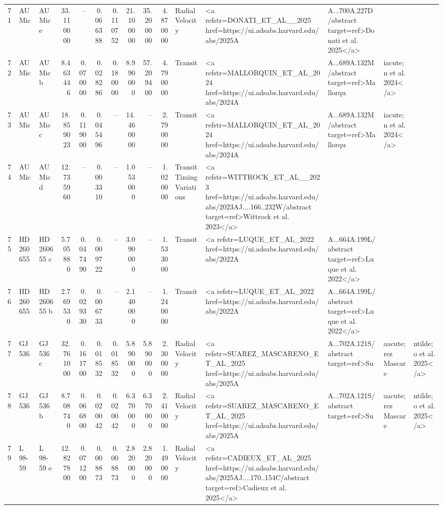 \begin{tabular}{lllrrrrrrrll}
71 & AU Mic & AU Mic e & 33.110000 & -- & 0.066388 & 0.110752 & 21.100000 & 35.200000 & 4.870000 & Radial Velocity & <a refstr=DONATI_ET_AL__2025 href=https://ui.adsabs.harvard.edu/abs/2025A&A...700A.227D/abstract target=ref>Donati et al. 2025</a> \\
72 & AU Mic & AU Mic b & 8.463446 & 0.070000 & 0.028286 & 0.180000 & 8.990000 & 57.209400 & 4.790000 & Transit & <a refstr=MALLORQUIN_ET_AL_2024 href=https://ui.adsabs.harvard.edu/abs/2024A&A...689A.132M/abstract target=ref>Mallorqu&iacute;n et al. 2024</a> \\
73 & AU Mic & AU Mic c & 18.859023 & 0.119000 & 0.045496 & -- & 14.460000 & -- & 2.790000 & Transit & <a refstr=MALLORQUIN_ET_AL_2024 href=https://ui.adsabs.harvard.edu/abs/2024A&A...689A.132M/abstract target=ref>Mallorqu&iacute;n et al. 2024</a> \\
74 & AU Mic & AU Mic d & 12.735960 & -- & 0.003310 & -- & 1.053000 & -- & 1.020000 & Transit Timing Variations & <a refstr=WITTROCK_ET_AL__2023 href=https://ui.adsabs.harvard.edu/abs/2023AJ....166..232W/abstract target=ref>Wittrock et al. 2023</a> \\
75 & HD 260655 & HD 260655 c & 5.705880 & 0.047490 & 0.009722 & -- & 3.090000 & -- & 1.533000 & Transit & <a refstr=LUQUE_ET_AL_2022 href=https://ui.adsabs.harvard.edu/abs/2022A&A...664A.199L/abstract target=ref>Luque et al. 2022</a> \\
76 & HD 260655 & HD 260655 b & 2.769530 & 0.029330 & 0.006733 & -- & 2.140000 & -- & 1.240000 & Transit & <a refstr=LUQUE_ET_AL_2022 href=https://ui.adsabs.harvard.edu/abs/2022A&A...664A.199L/abstract target=ref>Luque et al. 2022</a> \\
77 & GJ 536 & GJ 536 c & 32.761000 & 0.161700 & 0.018532 & 0.018532 & 5.890000 & 5.890000 & 2.300000 & Radial Velocity & <a refstr=SUAREZ_MASCARENO_ET_AL_2025 href=https://ui.adsabs.harvard.edu/abs/2025A&A...702A.121S/abstract target=ref>Su&aacute;rez Mascare&ntilde;o et al. 2025</a> \\
78 & GJ 536 & GJ 536 b & 8.708740 & 0.066800 & 0.020042 & 0.020042 & 6.370000 & 6.370000 & 2.410000 & Radial Velocity & <a refstr=SUAREZ_MASCARENO_ET_AL_2025 href=https://ui.adsabs.harvard.edu/abs/2025A&A...702A.121S/abstract target=ref>Su&aacute;rez Mascare&ntilde;o et al. 2025</a> \\
79 & L 98-59 & L 98-59 e & 12.827800 & 0.071200 & 0.008873 & 0.008873 & 2.820000 & 2.820000 & 1.490000 & Radial Velocity & <a refstr=CADIEUX_ET_AL_2025 href=https://ui.adsabs.harvard.edu/abs/2025AJ....170..154C/abstract target=ref>Cadieux et al. 2025</a> \\

\end{tabular}
